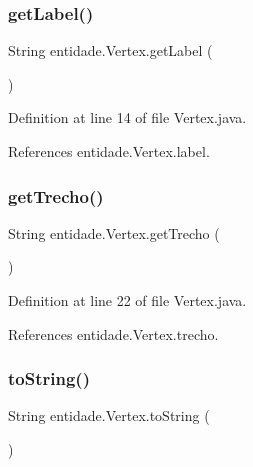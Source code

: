 \hypertarget{classentidade_1_1Vertex_a29b7642968d6ac8634e004c223dfac59}{}\label{classentidade_1_1Vertex_a29b7642968d6ac8634e004c223dfac59} 
\subsubsection{\texorpdfstring{get\+Label()}{getLabel()}}
{\footnotesize\ttfamily String entidade.\+Vertex.\+get\+Label (\begin{DoxyParamCaption}{ }\end{DoxyParamCaption})}



Definition at line 14 of file Vertex.\+java.



References entidade.\+Vertex.\+label.

\hypertarget{classentidade_1_1Vertex_ad70170f4e7e3b700ac8042024034e311}{}\label{classentidade_1_1Vertex_ad70170f4e7e3b700ac8042024034e311} 
\subsubsection{\texorpdfstring{get\+Trecho()}{getTrecho()}}
{\footnotesize\ttfamily String entidade.\+Vertex.\+get\+Trecho (\begin{DoxyParamCaption}{ }\end{DoxyParamCaption})}



Definition at line 22 of file Vertex.\+java.



References entidade.\+Vertex.\+trecho.

\hypertarget{classentidade_1_1Vertex_a152cee1b8109d23baa3f1e2d194b0e48}{}\label{classentidade_1_1Vertex_a152cee1b8109d23baa3f1e2d194b0e48} 
\subsubsection{\texorpdfstring{to\+String()}{toString()}}
{\footnotesize\ttfamily String entidade.\+Vertex.\+to\+String (\begin{DoxyParamCaption}{ }\end{DoxyParamCaption})}



